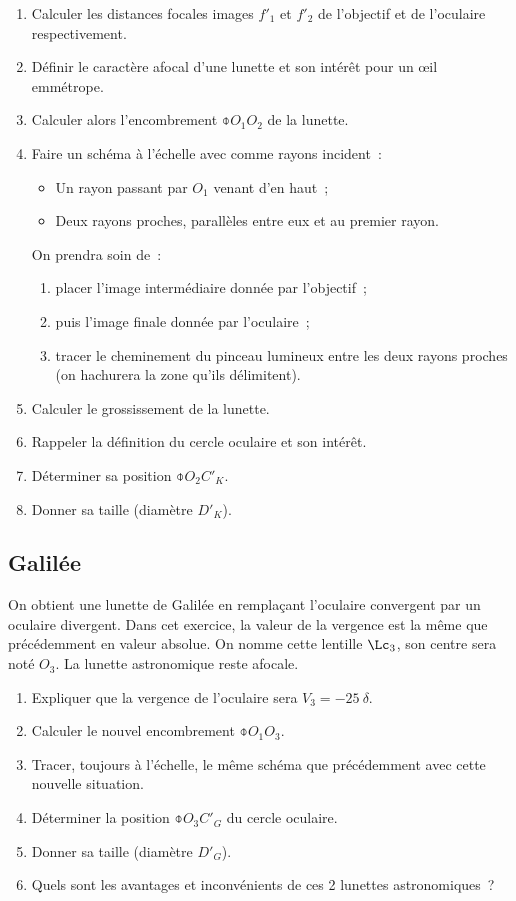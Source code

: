 \documentclass[a4paper, 12pt, final, garamond]{book}
\begin{document}
\begin{enumerate}
    \item Calculer les distances focales images $f'_1$ et $f'_2$ de l'objectif
        et de l'oculaire respectivement.
    \item Définir le caractère afocal d'une lunette et son intérêt pour un
        œil emmétrope.
    \item Calculer alors l'encombrement $\obar{O_1O_2}$ de la lunette.
    \item Faire un schéma à l'échelle avec comme rayons incident~:
        \begin{itemize}
            \item Un rayon passant par $O_1$ venant d'en haut~;
            \item Deux rayons proches, parallèles entre eux et au premier rayon.
        \end{itemize}
        On prendra soin de~:
        \begin{enumerate}
            \item placer l'image intermédiaire donnée par l'objectif~;
            \item puis l'image finale donnée par l'oculaire~;
            \item tracer le cheminement du pinceau lumineux entre les deux
                rayons proches (on hachurera la zone qu'ils délimitent).
        \end{enumerate}
    \item Calculer le grossissement de la lunette.
    \item Rappeler la définition du cercle oculaire et son intérêt.
    \item Déterminer sa position $\obar{O_2C'_K}$.
    \item Donner sa taille (diamètre $D'_K$).
\end{enumerate}

\subsection{Galilée}

On obtient une lunette de Galilée en remplaçant l'oculaire convergent par un
oculaire divergent. Dans cet exercice, la valeur de la vergence est la même que
précédemment en valeur absolue. On nomme cette lentille $\Lc_3$, son centre sera
noté $O_3$. La lunette astronomique reste afocale.

\begin{enumerate}
    \item Expliquer que la vergence de l'oculaire sera $V_3 = \SI{-25}{\delta}$.
    \item Calculer le nouvel encombrement $\obar{O_1O_3}$.
    \item Tracer, toujours à l'échelle, le même schéma que précédemment avec
        cette nouvelle situation.
    \item Déterminer la position $\obar{O_3C'_G}$ du cercle oculaire.
    \item Donner sa taille (diamètre $D'_G$).
    \item Quels sont les avantages et inconvénients de ces 2 lunettes
        astronomiques~?
\end{enumerate}
\end{document}

